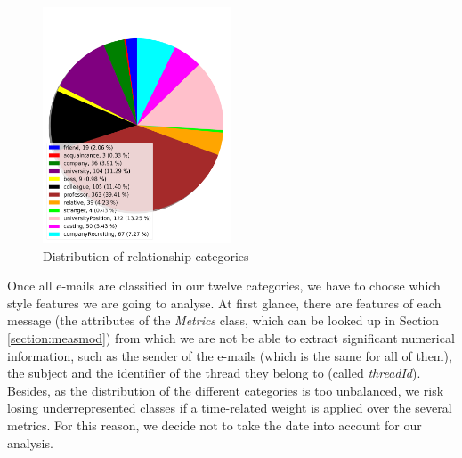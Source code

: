 \begin{figure}
	\centering%
	\centerline{\includegraphics[width=0.5\textwidth]{Imagenes/Bitmap/classdistributionpie.png}}%
	\caption{Distribution of relationship categories}%
	\label{fig:distr}
\end{figure}

Once all e-mails are classified in our twelve categories, we have to choose which style features we are going to analyse. At first glance, there are features of each message (the attributes of the \textit{Metrics} class, which can be looked up in Section \ref{section:measmod}) from which we are not be able to extract significant numerical information, such as the sender of the e-mails (which is the same for all of them), the subject and the identifier of the thread they belong to (called \textit{threadId}). Besides, as the distribution of the different categories is too unbalanced, we risk losing underrepresented classes if a time-related weight is applied over the several metrics. For this reason, we decide not to take the date into account for our analysis.

